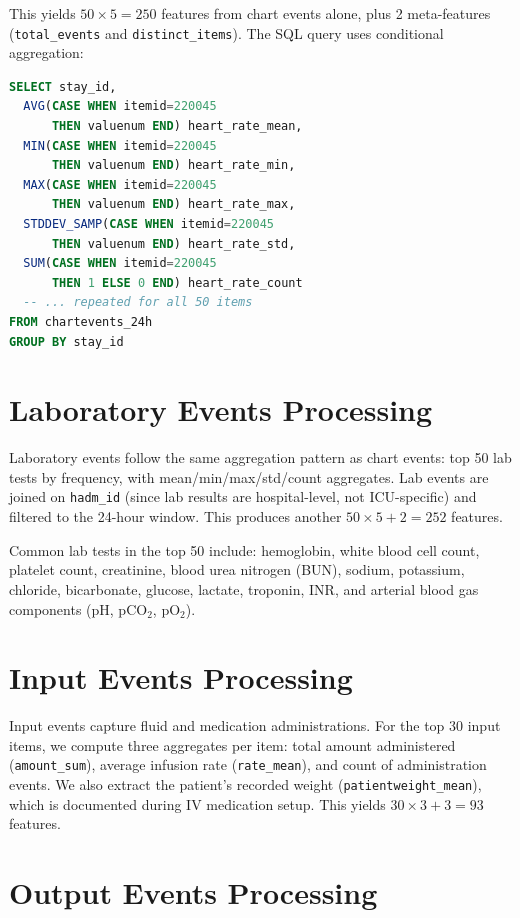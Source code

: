 \documentclass[11pt,a4paper]{report}
\begin{document}
This yields $50 \times 5 = 250$ features from chart events alone, plus 2 meta-features (\texttt{total\_events} and \texttt{distinct\_items}). The SQL query uses conditional aggregation:

\begin{lstlisting}[language=SQL,basicstyle=\small\ttfamily]
SELECT stay_id,
  AVG(CASE WHEN itemid=220045
      THEN valuenum END) heart_rate_mean,
  MIN(CASE WHEN itemid=220045
      THEN valuenum END) heart_rate_min,
  MAX(CASE WHEN itemid=220045
      THEN valuenum END) heart_rate_max,
  STDDEV_SAMP(CASE WHEN itemid=220045
      THEN valuenum END) heart_rate_std,
  SUM(CASE WHEN itemid=220045
      THEN 1 ELSE 0 END) heart_rate_count
  -- ... repeated for all 50 items
FROM chartevents_24h
GROUP BY stay_id
\end{lstlisting}

\section{Laboratory Events Processing}

Laboratory events follow the same aggregation pattern as chart events: top 50 lab tests by frequency, with mean/min/max/std/count aggregates. Lab events are joined on \texttt{hadm\_id} (since lab results are hospital-level, not ICU-specific) and filtered to the 24-hour window. This produces another $50 \times 5 + 2 = 252$ features.

Common lab tests in the top 50 include: hemoglobin, white blood cell count, platelet count, creatinine, blood urea nitrogen (BUN), sodium, potassium, chloride, bicarbonate, glucose, lactate, troponin, INR, and arterial blood gas components (pH, pCO$_2$, pO$_2$).

\section{Input Events Processing}

Input events capture fluid and medication administrations. For the top 30 input items, we compute three aggregates per item: total amount administered (\texttt{amount\_sum}), average infusion rate (\texttt{rate\_mean}), and count of administration events. We also extract the patient's recorded weight (\texttt{patientweight\_mean}), which is documented during IV medication setup. This yields $30 \times 3 + 3 = 93$ features.

\section{Output Events Processing}
\end{document}
